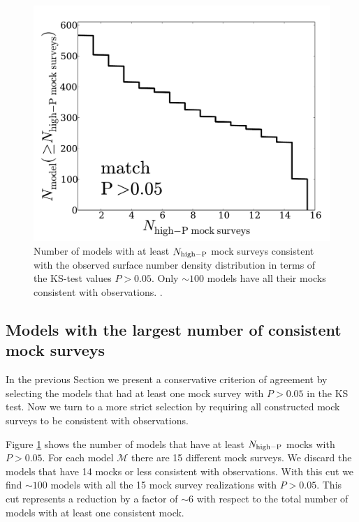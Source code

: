 \documentclass[usenatbib]{mn2e}
\begin{document}
\begin{figure}
\begin{center}
\includegraphics[width=0.95\linewidth,angle=0]{./plots/Fig4_match_P5.pdf}
\end{center} 
\caption{ Number of models with at least $N_{\rm high-P}$ mock surveys
  consistent with the observed surface number density
  distribution in terms of the KS-test values $P>0.05$. Only $\sim
  100$ models have all their mocks consistent with observations. 
  \label{fig:high_success_rate}.}  
\end{figure}
 
\subsection{Models with the largest number of consistent mock surveys}

In the previous Section we present a conservative criterion of
agreement by selecting the models that had at least one mock survey
with $P>0.05$ in the KS test. Now we turn to a more strict selection
by requiring all constructed mock surveys to be consistent with
observations. 


Figure \ref{fig:high_success_rate} shows the number of models
that have at least $N_{\rm high-P}$ mocks with $P>0.05$. For each
model ${\mathcal M}$ there are 15 different mock surveys.  We discard
the models that have 14 mocks or less consistent with
observations. With this cut we find $\sim 100$ models with all the 15
mock survey realizations with $P>0.05$.  This cut represents a
reduction by a factor of $\sim 6$ with respect to the total number of
models with at least one consistent mock.   
\end{document}
